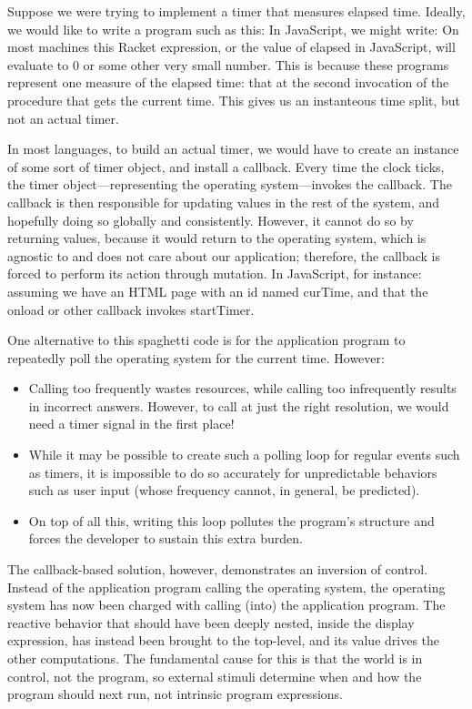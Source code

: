 
Suppose we were trying to implement a timer that measures elapsed time. Ideally,
we would like to write a program such as this:
In JavaScript, we might write:
On most machines this Racket expression, or the value of elapsed in JavaScript,
will evaluate to 0 or some other very small number. This is because these
programs represent one measure of the elapsed time: that at the second
invocation of the procedure that gets the current time. This gives us an
instanteous time split, but not an actual timer.

In most languages, to build an actual timer, we would have to create an instance
of some sort of timer object, and install a callback. Every time the clock
ticks, the timer object—representing the operating system—invokes the callback.
The callback is then responsible for updating values in the rest of the system,
and hopefully doing so globally and consistently. However, it cannot do so by
returning values, because it would return to the operating system, which is
agnostic to and does not care about our application; therefore, the callback is
forced to perform its action through mutation. In JavaScript, for instance:
assuming we have an HTML page with an id named curTime, and that the onload or
other callback invokes startTimer.

One alternative to this spaghetti code is for the application program to
repeatedly poll the operating system for the current time. However:
\begin{itemize}
  \item 
Calling too frequently wastes resources, while calling too infrequently results
in incorrect answers. However, to call at just the right resolution, we would
need a timer signal in the first place!
  \item 
While it may be possible to create such a polling loop for regular events such
as timers, it is impossible to do so accurately for unpredictable behaviors such
as user input (whose frequency cannot, in general, be predicted).
  \item 
On top of all this, writing this loop pollutes the program’s structure and
forces the developer to sustain this extra burden.
\end{itemize}

The callback-based solution, however, demonstrates an inversion of control.
Instead of the application program calling the operating system, the operating
system has now been charged with calling (into) the application program. The
reactive behavior that should have been deeply nested, inside the display
expression, has instead been brought to the top-level, and its value drives the
other computations. The fundamental cause for this is that the world is in
control, not the program, so external stimuli determine when and how the program
should next run, not intrinsic program expressions.
